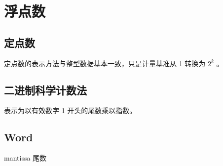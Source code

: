 \documentclass[cn,11pt,chinese,black,simple]{../elegantbook}
\begin{document}
\fi 
\def\chapname{03float}

\chapter{浮点数}

\section{定点数}

定点数的表示方法与整型数据基本一致，只是计量基准从 1 转换为 \(2^k\) 。

\section{二进制科学计数法}

表示为以有效数字 1 开头的尾数乘以指数。


\section*{Word}

mantissa 尾数


\let\chapname\undefined
\ifx\mainclass\undefined
\end{document}
